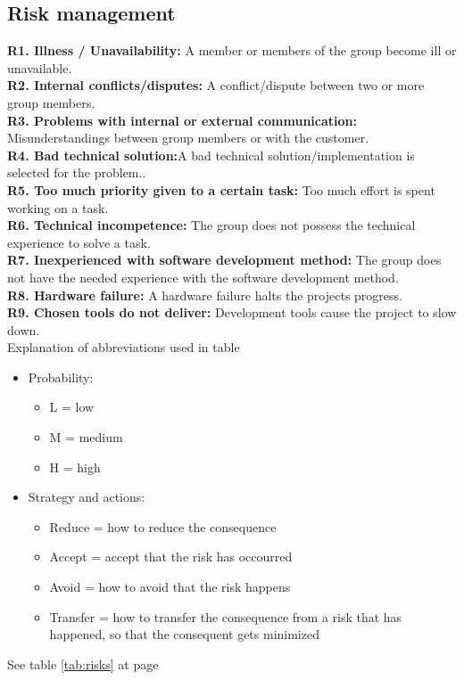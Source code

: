 

\subsection{Risk management}

\textbf{R1. Illness / Unavailability:} A member or members of the group become ill or unavailable. \\
\textbf{R2. Internal conflicts/disputes:} A conflict/dispute between two or more group members. \\
\textbf{R3. Problems with internal or external communication:} Misunderstandings between group members or with the customer. \\
\textbf{R4. Bad technical solution:}A bad technical solution/implementation is selected for the problem.. \\
\textbf{R5. Too much priority given to a certain task:} Too much effort is spent working on a task. \\
\textbf{R6. Technical incompetence:} The group does not possess the technical experience to solve a task. \\
\textbf{R7. Inexperienced with software development method:} The group does not have the needed experience with the software development method. \\
\textbf{R8. Hardware failure:} A hardware failure halts the projects progress. \\
\textbf{R9. Chosen tools do not deliver:} Development tools cause the project to slow down. \\

Explanation of abbreviations used in table%
\begin{itemize}
\item{}Probability:
\begin{itemize}
\item{}L = low
\item{}M = medium
\item{}H = high
\end{itemize}
\item{}Strategy and actions:
\begin{itemize}
\item{}Reduce = how to reduce the consequence
\item{}Accept = accept that the risk has occourred
\item{}Avoid = how to avoid that the risk happens
\item{}Transfer = how to transfer the consequence from a risk that has happened, so that the consequent gets minimized
\end{itemize}
\end{itemize}

See table \ref{tab:risks} at page \pageref{tab:risks}








